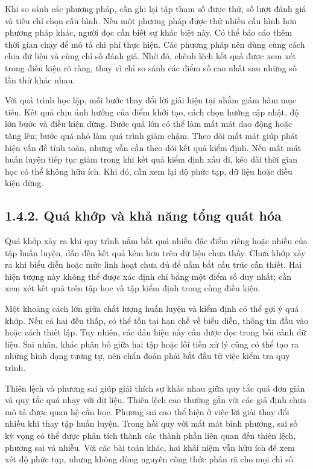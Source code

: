 Khi so sánh các phương pháp, cần ghi lại tập tham số được thử, số lượt đánh giá và tiêu chí chọn cấu hình. Nếu một phương pháp được thử nhiều cấu hình hơn phương pháp khác, người đọc cần biết sự khác biệt này. Có thể báo cáo thêm thời gian chạy để mô tả chi phí thực hiện. Các phương pháp nên dùng cùng cách chia dữ liệu và cùng chỉ số đánh giá. Nhờ đó, chênh lệch kết quả được xem xét trong điều kiện rõ ràng, thay vì chỉ so sánh các điểm số cao nhất sau những số lần thử khác nhau.


Với quá trình học lặp, mỗi bước thay đổi lời giải hiện tại nhằm giảm hàm mục tiêu. Kết quả chịu ảnh hưởng của điểm khởi tạo, cách chọn hướng cập nhật, độ lớn bước và điều kiện dừng. Bước quá lớn có thể làm mất mát dao động hoặc tăng lên; bước quá nhỏ làm quá trình giảm chậm. Theo dõi mất mát giúp phát hiện vấn đề tính toán, nhưng vẫn cần theo dõi kết quả kiểm định. Nếu mất mát huấn luyện tiếp tục giảm trong khi kết quả kiểm định xấu đi, kéo dài thời gian học có thể không hữu ích. Khi đó, cần xem lại độ phức tạp, dữ liệu hoặc điều kiện dừng.


\subsection{1.4.2. Quá khớp và khả năng tổng quát hóa}

Quá khớp xảy ra khi quy trình nắm bắt quá nhiều đặc điểm riêng hoặc nhiễu của tập huấn luyện, dẫn đến kết quả kém hơn trên dữ liệu chưa thấy. Chưa khớp xảy ra khi biểu diễn hoặc mức linh hoạt chưa đủ để nắm bắt cấu trúc cần thiết. Hai hiện tượng này không thể được xác định chỉ bằng một điểm số duy nhất; cần xem xét kết quả trên tập học và tập kiểm định trong cùng điều kiện.


Một khoảng cách lớn giữa chất lượng huấn luyện và kiểm định có thể gợi ý quá khớp. Nếu cả hai đều thấp, có thể tồn tại hạn chế về biểu diễn, thông tin đầu vào hoặc cách thiết lập. Tuy nhiên, các dấu hiệu này cần được đọc trong bối cảnh dữ liệu. Sai nhãn, khác phân bố giữa hai tập hoặc lỗi tiền xử lý cũng có thể tạo ra những hình dạng tương tự, nên chẩn đoán phải bắt đầu từ việc kiểm tra quy trình.


Thiên lệch và phương sai giúp giải thích sự khác nhau giữa quy tắc quá đơn giản và quy tắc quá nhạy với dữ liệu. Thiên lệch cao thường gắn với các giả định chưa mô tả được quan hệ cần học. Phương sai cao thể hiện ở việc lời giải thay đổi nhiều khi thay tập huấn luyện. Trong hồi quy với mất mát bình phương, sai số kỳ vọng có thể được phân tích thành các thành phần liên quan đến thiên lệch, phương sai và nhiễu. Với các bài toán khác, hai khái niệm vẫn hữu ích để xem xét độ phức tạp, nhưng không dùng nguyên công thức phân rã cho mọi chỉ số.


